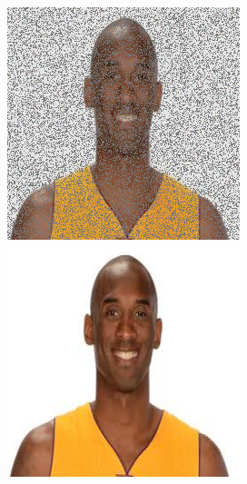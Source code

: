 \begin{figure}[H]
  \centering
  \begin{minipage}[b]{0.3\linewidth}
\includegraphics[width=\linewidth]{Picture/input/mamba_input.png}
  \end{minipage}
  \hspace{0.1cm} %
   \begin{minipage}[b]{0.3\linewidth}
    \includegraphics[width=\linewidth]{Picture/label/mamba_label.png}

\end{minipage}
\end{figure}
